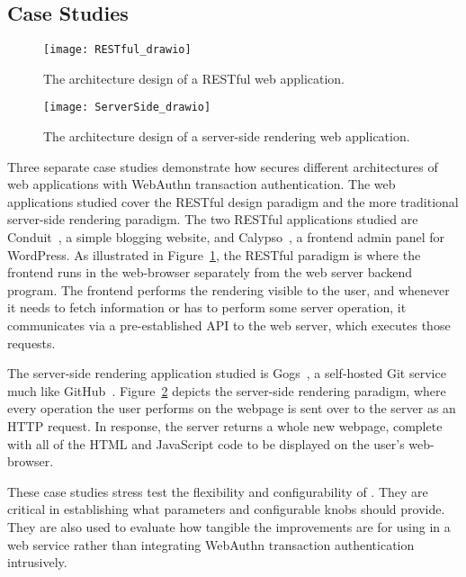 \subsection{Case Studies}

\begin{figure}[h]
  \centering
  \texttt{[image: RESTful\_drawio]}
  \caption{The architecture design of a RESTful web application.}
  \label{Fig:CaseStudiesRESTful}
\end{figure}

\begin{figure}[h]
  \centering
  \texttt{[image: ServerSide\_drawio]}
  \caption{The architecture design of a server-side rendering web application.}
  \label{Fig:CaseStudiesServerSide}
\end{figure}

Three separate case studies demonstrate how \sys{} secures different architectures of web applications with WebAuthn transaction authentication. The web applications studied cover the RESTful design paradigm and the more traditional server-side rendering paradigm. The two RESTful applications studied are Conduit~\cite{conduit}, a simple blogging website, and Calypso~\cite{calypso}, a frontend admin panel for WordPress. As illustrated in Figure~\ref{Fig:CaseStudiesRESTful}, the RESTful paradigm is where the frontend runs in the web-browser separately from the web server backend program. The frontend performs the rendering visible to the user, and whenever it needs to fetch information or has to perform some server operation, it communicates via a pre-established API to the web server, which executes those requests. 

The server-side rendering application studied is Gogs~\cite{gogs}, a self-hosted Git service much like GitHub~\cite{github}. Figure~\ref{Fig:CaseStudiesServerSide} depicts the server-side rendering paradigm, where every operation the user performs on the webpage is sent over to the server as an HTTP request. In response, the server returns a whole new webpage, complete with all of the HTML and JavaScript code to be displayed on the user's web-browser.


These case studies stress test the flexibility and configurability of \sys{}. They are critical in establishing what parameters and configurable knobs \sys{} should provide. They are also used to evaluate how tangible the improvements are for using \sys{} in a web service rather than integrating WebAuthn transaction authentication intrusively. 

